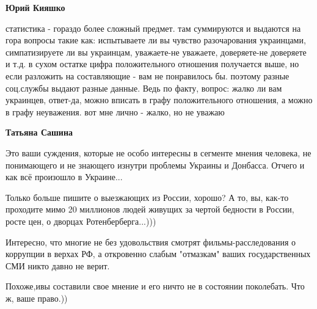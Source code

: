 \begin{itemize}
\begin{itemize}
 
\textbf{Юрий Кияшко} 

статистика - гораздо более сложный предмет. там суммируются и выдаются на гора
вопросы такие как: испытываете ли вы чувство разочарования украинцами,
симпатизируете ли вы украинцам, уважаете-не уважаете, доверяете-не доверяете и
т.д. в сухом остатке цифра положительного отношения получается выше, но если
разложить на составляющие - вам не понравилось бы. поэтому разные соц.службы
выдают разные данные. Ведь по факту, вопрос: жалко ли вам украинцев, ответ-да,
можно вписать в графу положительного отношения, а можно в графу неуважения. вот
мне лично - жалко, но не уважаю


 
\textbf{Татьяна Сашина}

Это ваши суждения, которые не особо интересны в сегменте мнения человека, не
понимающего и не знающего изнутри проблемы Украины и Донбасса. Отчего и как всё
произошло в Украине...

Только больше пишите о выезжающих из России, хорошо? А то, вы, как-то проходите
мимо 20 миллионов людей живущих за чертой бедности в России, росте цен, о
дворцах Ротенберберга...)))

Интересно, что многие не без удовольствия смотрят фильмы-расследования о
коррупции в верхах РФ, а откровенно слабым "отмазкам" ваших государственных СМИ
никто давно не верит.


 

Похоже,ивы составили свое мнение и его ничто не в состоянии поколебать. Что ж,
ваше право.))

 

\end{itemize}
\end{itemize}
